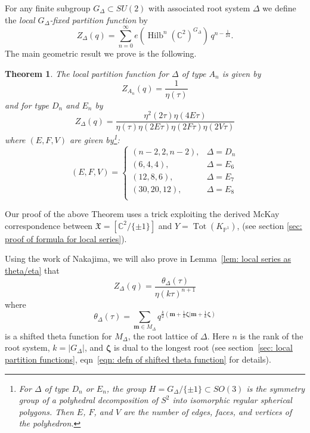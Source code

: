\documentclass{amsart}
\newtheorem{theorem}{Theorem}[section]
\theoremstyle{definition}
\newcommand{\CC} {{\mathbb C}}          %
\newcommand{\PP}{\mathbb{P}}
\newcommand{\X}{\mathfrak{X}}
\newcommand{\mvec}{\bm{m}}
\newcommand{\zetavec}{\bm{\zeta }}
\newcommand{\Hilb}{\operatorname{Hilb}}
\begin{document}
For any finite subgroup $G_{\Delta}\subset SU(2)$ with associated root
system $\Delta$ we define the \emph{local $G_{\Delta }$-fixed
partition function} by
\[
Z_{\Delta} (q) = \sum_{n=0}^{\infty}
e\left(\Hilb^{n}(\CC^{2})^{G_{\Delta}} \right) \, q^{n-\frac{1}{24}} .
\]
The main geometric result we prove is the following. 
\begin{theorem}\label{thm: formula for local series (in intro)}
The local partition function for $\Delta$ of type $A_{n}$ is given by 
\[
Z_{A_{n}}(q) = \frac{1}{\eta (\tau )}
\]
and for type $D_{n}$ and $E_{n}$ by
\[
Z_{\Delta}(q) = \frac{\eta^{2}(2\tau )\eta (4E\tau )}{\eta (\tau )\eta (2E\tau )\eta (2F\tau )\eta (2V\tau )}
\]
where $(E,F,V)$ are given by\footnote{For $\Delta$ of type
$D_{n}$ or $E_{n}$, the group $H = G_{\Delta}/\{\pm 1 \}\subset SO(3)$
is the symmetry group of a polyhedral decomposition of $S^{2}$ into
isomorphic regular spherical polygons. Then $E$, $F$, and $V$ are the
number of edges, faces, and vertices of the polyhedron.}:
\[
(E,F,V) = \begin{cases}
(n-2,2,n-2), & \Delta =D_{n}\\
(6,4,4), & \Delta =E_{6}\\
(12,8,6), & \Delta =E_{7}\\
(30,20,12), & \Delta =E_{8}\\
\end{cases}
\]
\end{theorem}
Our proof of the above Theorem uses a trick exploiting the derived
McKay correspondence between $\X =[\CC^{2}/\{\pm 1 \}]$ and
$Y=\operatorname{Tot}(K_{\PP^{1}})$, (see section \ref{sec: proof of
formula for local series}).




Using the work of Nakajima, we will also prove in Lemma~\ref{lem: local
series as theta/eta} that
\[
Z_{\Delta}(q) =\frac{\theta_{\Delta}(\tau)}{\eta (k\tau )^{n+1}}
\]
where 
\[
\theta_{\Delta}(\tau ) = \sum_{\mvec \in M_{\Delta}}
q^{\frac{k}{2}\left(\mvec +\frac{1}{k}\zetavec |\mvec
+\frac{1}{k}\zetavec \right)}
\]
is a shifted theta function for $M_{\Delta} $, the root lattice of
$\Delta$. Here $n$ is the rank of the root system, $k=|G_{\Delta}|$,
and $\zetavec$ is dual to the longest root (see section~\ref{sec:
local partition functions}, eqn~\eqref{eqn: defn of shifted theta
function} for details).
\end{document}
